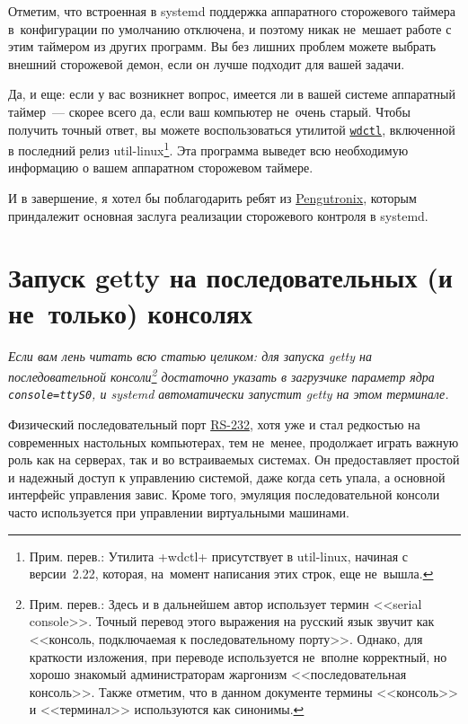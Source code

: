 \documentclass[10pt,oneside,a4paper]{article}
\newcommand{\hreftt}[2]{\href{#1}{\texttt{#2}}}
\begin{document}
Отметим, что встроенная в systemd поддержка аппаратного сторожевого таймера
в~конфигурации по умолчанию отключена, и поэтому никак не~мешает работе с этим
таймером из других программ. Вы без лишних проблем можете выбрать внешний
сторожевой демон, если он лучше подходит для вашей задачи.

Да, и еще: если у вас возникнет вопрос, имеется ли в вашей системе аппаратный
таймер~--- скорее всего да, если ваш компьютер не~очень старый. Чтобы получить
точный ответ, вы можете воспользоваться утилитой
\hreftt{http://karelzak.blogspot.de/2012/05/eject1-sulogin1-wdctl1.html}{wdctl},
включенной в последний релиз util-linux\footnote{Прим. перев.: Утилита +wdctl+
присутствует в util-linux, начиная с версии~2.22, которая, на~момент написания
этих строк, еще не~вышла.}. Эта программа выведет всю необходимую
информацию о вашем аппаратном сторожевом таймере.

И в завершение, я хотел бы поблагодарить ребят из
\href{http://www.pengutronix.de/}{Pengutronix}, которым приндалежит основная
заслуга реализации сторожевого контроля в systemd.

\section{Запуск getty на последовательных (и не~только) консолях}
\label{sec:getty}

\emph{Если вам лень читать всю статью целиком: для запуска getty на
последовательной консоли\footnote{Прим. перев.: Здесь и в дальнейшем автор
использует термин <<serial console>>. Точный перевод этого выражения на русский
язык звучит как <<консоль, подключаемая к последовательному порту>>.  Однако,
для краткости изложения, при переводе используется не~вполне корректный, но
хорошо знакомый администраторам жаргонизм <<последовательная консоль>>. Также
отметим, что в данном документе термины <<консоль>> и <<терминал>> используются
как синонимы.} достаточно указать в загрузчике параметр ядра
\verb+console=ttyS0+, и systemd автоматически запустит getty на этом терминале.}

Физический последовательный порт 
\href{https://ru.wikipedia.org/wiki/RS-232}{RS-232}, хотя уже и стал редкостью
на современных настольных компьютерах, тем не~менее, продолжает играть важную
роль как на серверах, так и во встраиваемых системах. Он предоставляет простой и
надежный доступ к управлению системой, даже когда сеть упала, а основной
интерфейс управления завис. Кроме того, эмуляция последовательной консоли часто
используется при управлении виртуальными машинами.
\end{document}
